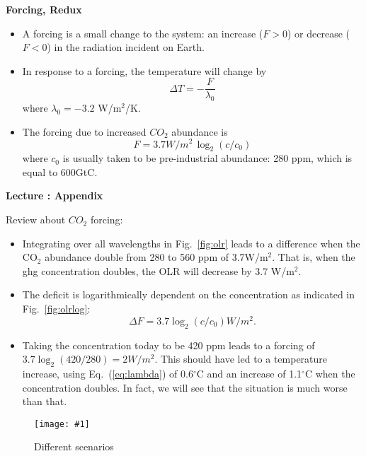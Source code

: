 \documentclass[11pt]{book}
\def\be{\begin{equation}}
\def\ee{\end{equation}}
\newcommand{\ec}[1]{Eq.~(\ref{eq:#1})}
\newcommand{\eql}[1]{\label{eq:#1}}
\newcommand{\sfig}[2]{
\texttt{[image: \#1]}
        }
\newcommand{\Sfig}[2]{
   \begin{figure}[thbp]
   \begin{center}
    \sfig{../Figures/#1.pdf}{0.7\columnwidth}
    \caption{{\small #2}}
    \label{fig:#1}
     \end{center}
   \end{figure}
}
\newcommand{\Spng}[2]{
   \begin{figure}[thbp]
   \begin{center}
    \sfig{../Figures/#1.png}{0.7\columnwidth}
    \caption{{\small #2}}
    \label{fig:#1}
     \end{center}
   \end{figure}
}
\newcommand{\rf}[1]{\ref{fig:#1}}
\newcommand\bei{\begin{itemize}}
\newcommand\eei{\end{itemize}}
\newcommand\lecture[1]{\newpage
\addtocounter{lectureno}{1}
\setcounter{secno}{0}
\begin{center}
 {\bf Lecture \arabic{lectureno}: #1}
\end{center}
}
\newcounter{lectureno}
\newcounter{secno}
\begin{document}
{\bf Forcing, Redux}
\bei
\item A forcing is a small change to the system: an increase ($F>0$) or decrease ($F<0$) in the radiation incident on Earth.
\item In response to a forcing, the temperature will change by
\be
\Delta T = -\frac{F}{\lambda_0}
\ee
where $\lambda_0=-3.2$ W/m$^2$/K.
\item The forcing due to increased $CO_2$ abundance is
\be
F = 3.7 W/m^2\, \log_2(c/c_0)
\ee
where $c_0$ is usually taken to be pre-industrial abundance: 280 ppm, which is equal to 600GtC.
\eei

\lecture{Appendix}

Review about $CO_2$ forcing:
\bei
\item Integrating over all wavelengths in Fig.~\rf{olr} leads to a difference when the CO$_2$ abundance double from 280 to 560 ppm of 3.7W/m$^2$. That is, when the ghg concentration doubles, the OLR will decrease by 3.7 W/m$^2$. 
\item The deficit is logarithmically dependent on the concentration as indicated in Fig.~\rf{olrlog}:
\be
\Delta F = 3.7\log_2(c/c_0) W/m^2.\eql{log}\ee 
\item Taking the concentration today to be 420 ppm leads to a forcing of $3.7\log_2(420/280)=2 W/m^2$. This should have led to a temperature increase, using \ec{lambda} of 0.6$^\circ$C and an increase of 1.1$^\circ$C when the concentration doubles. In fact, we will see that the situation is much worse than that.
\eei



\Sfig{ipcc6fig}{Different scenarios}
\end{document}
